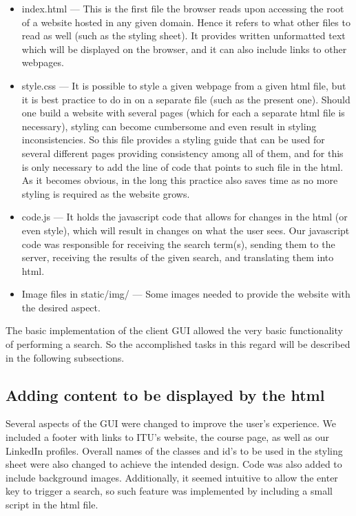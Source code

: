 \begin{itemize}
    \item index.html — This is the first file the browser reads upon accessing the root of a website hosted in any given domain. Hence it refers to what other files to read as well (such as the styling sheet). It provides written unformatted text which will be displayed on the browser, and it can also include links to other webpages.
    \item style.css — It is possible to style a given webpage from a given html file, but it is best practice to do in on a separate file (such as the present one). Should one build a website with several pages (which for each a separate html file is necessary), styling can become cumbersome and even result in styling inconsistencies. So this file provides a styling guide that can be used for several different pages providing consistency among all of them, and for this is only necessary to add the line of code that points to such file in the html. As it becomes obvious, in the long this practice also saves time as no more styling is required as the website grows.
    \item code.js — It holds the javascript code that allows for changes in the html (or even style), which will result in changes on what the user sees. Our javascript code was responsible for receiving the search term(s), sending them to the server, receiving the results of the given search, and translating them into html.
    \item Image files in static/img/ — Some images needed to provide the website with the desired aspect.
\end{itemize}
The basic implementation of the client GUI allowed the very basic functionality of performing a search. So the accomplished tasks in this regard will be described in the following subsections.
\subsection{Adding content to be displayed by the html}
Several aspects of the GUI were changed to improve the user's experience. We included a footer with links to ITU's website, the course page, as well as our LinkedIn profiles. Overall names of the classes and id's to be used in the styling sheet were also changed to achieve the intended design. Code was also added to include background images.
Additionally, it seemed intuitive to allow the enter key to trigger a search, so such feature was implemented by including a small script in the html file.

